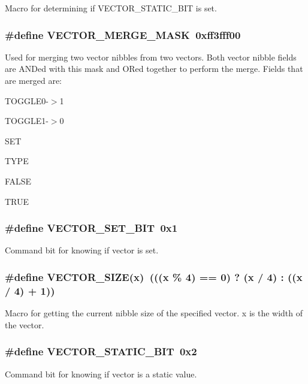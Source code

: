 Macro for determining if VECTOR\_\-STATIC\_\-BIT is set. 
\subsubsection{\setlength{\rightskip}{0pt plus 5cm}\#define VECTOR\_\-MERGE\_\-MASK\ 0xff3fff00}\label{group__vector__defs_a5}


Used for merging two vector nibbles from two vectors. Both vector nibble fields are ANDed with this mask and ORed together to perform the merge.  Fields that are merged are:\begin{CompactItemize}
\item 
TOGGLE0-$>$1\item 
TOGGLE1-$>$0\item 
SET\item 
TYPE\item 
FALSE\item 
TRUE \end{CompactItemize}
\subsubsection{\setlength{\rightskip}{0pt plus 5cm}\#define VECTOR\_\-SET\_\-BIT\ 0x1}\label{group__vector__defs_a0}


Command bit for knowing if vector is set. 
\subsubsection{\setlength{\rightskip}{0pt plus 5cm}\#define VECTOR\_\-SIZE(x)\ (((x \% 4) == 0) ? (x / 4) : ((x / 4) + 1))}\label{group__vector__defs_a4}


Macro for getting the current nibble size of the specified vector. x is the width of the vector. 
\subsubsection{\setlength{\rightskip}{0pt plus 5cm}\#define VECTOR\_\-STATIC\_\-BIT\ 0x2}\label{group__vector__defs_a1}


Command bit for knowing if vector is a static value. 
